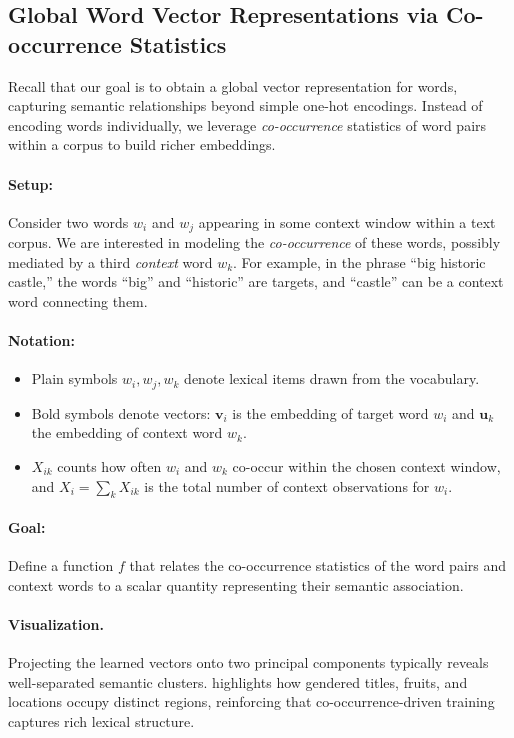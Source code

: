 \subsection{Global Word Vector Representations via Co-occurrence Statistics}
\label{sec:nlp_global_word_vector_representations_via_co_occurrence_statistics}

Recall that our goal is to obtain a global vector representation for words, capturing semantic relationships beyond simple one-hot encodings. Instead of encoding words individually, we leverage \emph{co-occurrence} statistics of word pairs within a corpus to build richer embeddings.

\paragraph{Setup:} Consider two words \( w_i \) and \( w_j \) appearing in some context window within a text corpus. We are interested in modeling the \emph{co-occurrence} of these words, possibly mediated by a third \emph{context} word \( w_k \). For example, in the phrase ``big historic castle,'' the words ``big'' and ``historic'' are targets, and ``castle'' can be a context word connecting them.

\paragraph{Notation:}
\begin{itemize}
    \item Plain symbols \(w_i, w_j, w_k\) denote lexical items drawn from the vocabulary.
    \item Bold symbols denote vectors: \(\mathbf{v}_i\) is the embedding of target word \(w_i\) and \(\mathbf{u}_k\) the embedding of context word \(w_k\).
    \item \( X_{ik} \) counts how often \(w_i\) and \(w_k\) co-occur within the chosen context window, and \( X_i = \sum_k X_{ik} \) is the total number of context observations for \(w_i\).
\end{itemize}

\paragraph{Goal:} Define a function \( f \) that relates the co-occurrence statistics of the word pairs and context words to a scalar quantity representing their semantic association.

\paragraph{Visualization.} Projecting the learned vectors onto two principal components typically reveals well-separated semantic clusters.  highlights how gendered titles, fruits, and locations occupy distinct regions, reinforcing that co-occurrence-driven training captures rich lexical structure.

